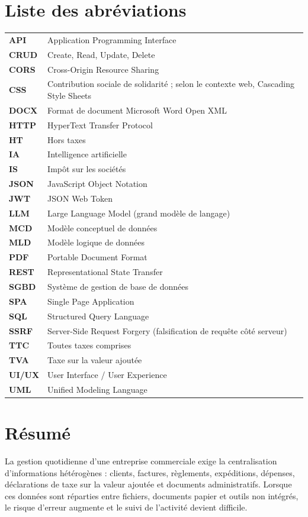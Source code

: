 \documentclass[12pt,a4paper,oneside]{report}
\begin{document}
\chapter*{Liste des abréviations}
\begin{longtable}{p{3cm}p{11cm}}
\textbf{API} & Application Programming Interface\\
\textbf{CRUD} & Create, Read, Update, Delete\\
\textbf{CORS} & Cross-Origin Resource Sharing\\
\textbf{CSS} & Contribution sociale de solidarité ; selon le contexte web, Cascading Style Sheets\\
\textbf{DOCX} & Format de document Microsoft Word Open XML\\
\textbf{HTTP} & HyperText Transfer Protocol\\
\textbf{HT} & Hors taxes\\
\textbf{IA} & Intelligence artificielle\\
\textbf{IS} & Impôt sur les sociétés\\
\textbf{JSON} & JavaScript Object Notation\\
\textbf{JWT} & JSON Web Token\\
\textbf{LLM} & Large Language Model (grand modèle de langage)\\
\textbf{MCD} & Modèle conceptuel de données\\
\textbf{MLD} & Modèle logique de données\\
\textbf{PDF} & Portable Document Format\\
\textbf{REST} & Representational State Transfer\\
\textbf{SGBD} & Système de gestion de base de données\\
\textbf{SPA} & Single Page Application\\
\textbf{SQL} & Structured Query Language\\
\textbf{SSRF} & Server-Side Request Forgery (falsification de requête côté serveur)\\
\textbf{TTC} & Toutes taxes comprises\\
\textbf{TVA} & Taxe sur la valeur ajoutée\\
\textbf{UI/UX} & User Interface / User Experience\\
\textbf{UML} & Unified Modeling Language\\
\end{longtable}
\clearpage


\chapter*{Résumé}
La gestion quotidienne d'une entreprise commerciale exige la centralisation d'informations hétérogènes : clients, factures, règlements, expéditions, dépenses, déclarations de taxe sur la valeur ajoutée et documents administratifs. Lorsque ces données sont réparties entre fichiers, documents papier et outils non intégrés, le risque d'erreur augmente et le suivi de l'activité devient difficile.
\end{document}
